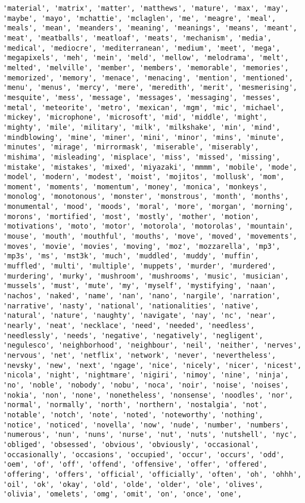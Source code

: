 \documentclass[11pt]{article}
\begin{document}
\begin{Verbatim}[commandchars=\\\{\}]
'material', 'matrix', 'matter', 'matthews', 'mature', 'max', 'may', 'maybe', 'mayo', 'mchattie', 'mclaglen', 'me', 'meagre', 'meal', 'meals', 'mean', 'meanders', 'meaning', 'meanings', 'means', 'meant', 'meat', 'meatballs', 'meatloaf', 'meats', 'mechanism', 'media', 'medical', 'mediocre', 'mediterranean', 'medium', 'meet', 'mega', 'megapixels', 'meh', 'mein', 'meld', 'mellow', 'melodrama', 'melt', 'melted', 'melville', 'member', 'members', 'memorable', 'memories', 'memorized', 'memory', 'menace', 'menacing', 'mention', 'mentioned', 'menu', 'menus', 'mercy', 'mere', 'meredith', 'merit', 'mesmerising', 'mesquite', 'mess', 'message', 'messages', 'messaging', 'messes', 'metal', 'meteorite', 'metro', 'mexican', 'mgm', 'mic', 'michael', 'mickey', 'microphone', 'microsoft', 'mid', 'middle', 'might', 'mighty', 'mile', 'military', 'milk', 'milkshake', 'min', 'mind', 'mindblowing', 'mine', 'miner', 'mini', 'minor', 'mins', 'minute', 'minutes', 'mirage', 'mirrormask', 'miserable', 'miserably', 'mishima', 'misleading', 'misplace', 'miss', 'missed', 'missing', 'mistake', 'mistakes', 'mixed', 'miyazaki', 'mmmm', 'mobile', 'mode', 'model', 'modern', 'modest', 'moist', 'mojitos', 'mollusk', 'mom', 'moment', 'moments', 'momentum', 'money', 'monica', 'monkeys', 'monolog', 'monotonous', 'monster', 'monstrous', 'month', 'months', 'monumental', 'mood', 'moods', 'moral', 'more', 'morgan', 'morning', 'morons', 'mortified', 'most', 'mostly', 'mother', 'motion', 'motivations', 'moto', 'motor', 'motorola', 'motorolas', 'mountain', 'mouse', 'mouth', 'mouthful', 'mouths', 'move', 'moved', 'movements', 'moves', 'movie', 'movies', 'moving', 'moz', 'mozzarella', 'mp3', 'mp3s', 'ms', 'mst3k', 'much', 'muddled', 'muddy', 'muffin', 'muffled', 'multi', 'multiple', 'muppets', 'murder', 'murdered', 'murdering', 'murky', 'mushroom', 'mushrooms', 'music', 'musician', 'mussels', 'must', 'mute', 'my', 'myself', 'mystifying', 'naan', 'nachos', 'naked', 'name', 'nan', 'nano', 'nargile', 'narration', 'narrative', 'nasty', 'national', 'nationalities', 'native', 'natural', 'nature', 'naughty', 'navigate', 'nay', 'nc', 'near', 'nearly', 'neat', 'necklace', 'need', 'needed', 'needless', 'needlessly', 'needs', 'negative', 'negatively', 'negligent', 'negulesco', 'neighborhood', 'neighbour', 'neil', 'neither', 'nerves', 'nervous', 'net', 'netflix', 'network', 'never', 'nevertheless', 'nevsky', 'new', 'next', 'ngage', 'nice', 'nicely', 'nicer', 'nicest', 'nicola', 'night', 'nightmare', 'nigiri', 'nimoy', 'nine', 'ninja', 'no', 'noble', 'nobody', 'nobu', 'noca', 'noir', 'noise', 'noises', 'nokia', 'non', 'none', 'nonetheless', 'nonsense', 'noodles', 'nor', 'normal', 'normally', 'north', 'northern', 'nostalgia', 'not', 'notable', 'notch', 'note', 'noted', 'noteworthy', 'nothing', 'notice', 'noticed', 'novella', 'now', 'nude', 'number', 'numbers', 'numerous', 'nun', 'nuns', 'nurse', 'nut', 'nuts', 'nutshell', 'nyc', 'obliged', 'obsessed', 'obvious', 'obviously', 'occasional', 'occasionally', 'occasions', 'occupied', 'occur', 'occurs', 'odd', 'oem', 'of', 'off', 'offend', 'offensive', 'offer', 'offered', 'offering', 'offers', 'official', 'officially', 'often', 'oh', 'ohhh', 'oil', 'ok', 'okay', 'old', 'olde', 'older', 'ole', 'olives', 'olivia', 'omelets', 'omg', 'omit', 'on', 'once', 'one', 
\end{Verbatim}
\end{document}
